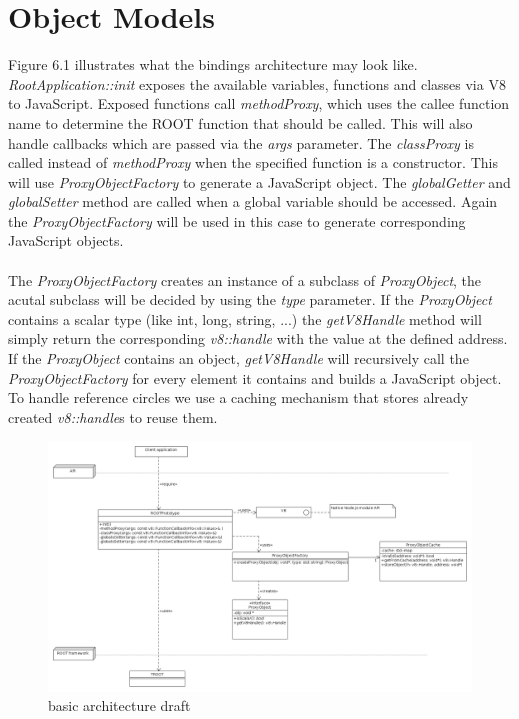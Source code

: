 \section{Object Models}
Figure 6.1 illustrates what the bindings architecture may look like.
\textit{RootApplication::init} exposes the available variables, functions and classes via V8 to JavaScript.
Exposed functions call \textit{methodProxy}, which uses the callee function name to determine the ROOT function that should be called. This will also handle callbacks which are passed via the \textit{args} parameter.
The \textit{classProxy} is called instead of \textit{methodProxy} when the specified function is a constructor. This will use \textit{ProxyObjectFactory} to generate a JavaScript object.
The \textit{globalGetter} and \textit{globalSetter} method are called when a global variable should be accessed. Again the \textit{ProxyObjectFactory} will be used in this case to generate corresponding JavaScript objects.
\\\\
The \textit{ProxyObjectFactory} creates an instance of a subclass of \textit{ProxyObject}, the acutal subclass will be decided by using the \textit{type} parameter.
If the \textit{ProxyObject} contains a scalar type (like int, long, string, ...) the \textit{getV8Handle} method will simply return the corresponding \textit{v8::handle} with the value at the defined address.
If the \textit{ProxyObject} contains an object, \textit{getV8Handle} will recursively call the \textit{ProxyObjectFactory} for every element it contains and builds a JavaScript object.
To handle reference circles we use a caching mechanism that stores already created \textit{v8::handle}s to reuse them.

\begin{figure}[htb]
	\centering
	\includegraphics[width=18cm]{./latex/resources/architecture.png}
	\caption{basic architecture draft}
\end{figure}

